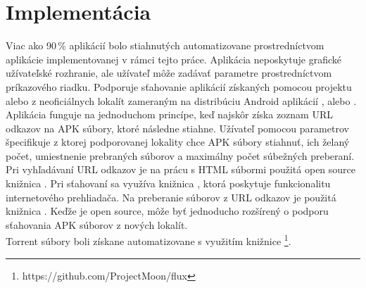 \section{Implementácia}
Viac ako 90\,\% aplikácií bolo stiahnutých automatizovane prostredníctvom aplikácie  implementovanej v rámci tejto práce. Aplikácia neposkytuje grafické užívateľské rozhranie, ale užívateľ môže zadávať parametre prostredníctvom príkazového riadku. Podporuje sťahovanie aplikácií získaných pomocou projektu  alebo z neoficiálnych lokalít zameraným na distribúciu Android aplikácií ,  alebo . Aplikácia funguje na jednoduchom princípe, keď najskôr získa zoznam URL odkazov na APK súbory, ktoré následne stiahne. Užívateľ pomocou parametrov špecifikuje z ktorej podporovanej lokality chce APK súbory stiahnuť, ich želaný počet, umiestnenie prebraných súborov a maximálny počet súbežných preberaní. Pri vyhľadávaní URL odkazov je na prácu s HTML súbormi použitá open source knižnica . Pri sťahovaní sa využíva knižnica , ktorá poskytuje funkcionalitu internetového prehliadača. Na preberanie súborov z URL odkazov je použitá knižnica . Keďže je  open source, môže byť jednoducho rozšírený o podporu sťahovania APK súborov z nových lokalít.\\
Torrent súbory boli získane automatizovane s využitím knižnice \footnote{https://github.com/ProjectMoon/flux}.
